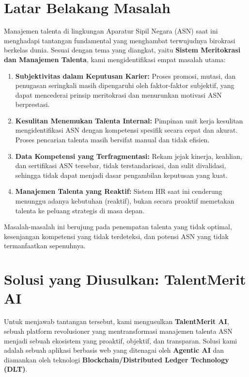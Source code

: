 \documentclass[11pt, a4paper]{article}
\begin{document}
\section{Latar Belakang Masalah}
Manajemen talenta di lingkungan Aparatur Sipil Negara (ASN) saat ini menghadapi tantangan fundamental yang menghambat terwujudnya birokrasi berkelas dunia. Sesuai dengan tema yang diangkat, yaitu \textbf{Sistem Meritokrasi dan Manajemen Talenta}, kami mengidentifikasi empat masalah utama:
\begin{enumerate}
    \item \textbf{Subjektivitas dalam Keputusan Karier:} Proses promosi, mutasi, dan penugasan seringkali masih dipengaruhi oleh faktor-faktor subjektif, yang dapat mencederai prinsip meritokrasi dan menurunkan motivasi ASN berprestasi.
    \item \textbf{Kesulitan Menemukan Talenta Internal:} Pimpinan unit kerja kesulitan mengidentifikasi ASN dengan kompetensi spesifik secara cepat dan akurat. Proses pencarian talenta masih bersifat manual dan tidak efisien.
    \item \textbf{Data Kompetensi yang Terfragmentasi:} Rekam jejak kinerja, keahlian, dan sertifikasi ASN tersebar, tidak terstandarisasi, dan sulit divalidasi, sehingga tidak dapat menjadi dasar pengambilan keputusan yang kuat.
    \item \textbf{Manajemen Talenta yang Reaktif:} Sistem HR saat ini cenderung menunggu adanya kebutuhan (reaktif), bukan secara proaktif memetakan talenta ke peluang strategis di masa depan.
\end{enumerate}
Masalah-masalah ini berujung pada penempatan talenta yang tidak optimal, kesenjangan kompetensi yang tidak terdeteksi, dan potensi ASN yang tidak termanfaatkan sepenuhnya.

\section{Solusi yang Diusulkan: TalentMerit AI}
Untuk menjawab tantangan tersebut, kami mengusulkan \textbf{TalentMerit AI}, sebuah platform revolusioner yang mentransformasi manajemen talenta ASN menjadi sebuah ekosistem yang proaktif, objektif, dan transparan. Solusi kami adalah sebuah aplikasi berbasis web yang ditenagai oleh \textbf{Agentic AI} dan diamankan oleh teknologi \textbf{Blockchain/Distributed Ledger Technology (DLT)}.
\end{document}
